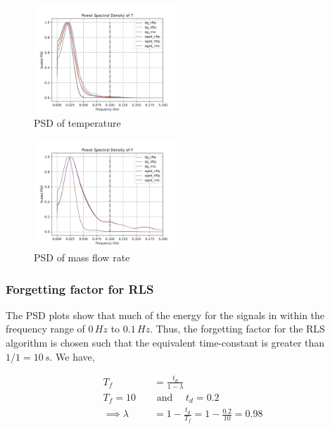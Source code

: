 \begin{multicols}{2}
       \begin{figure}[H]
        \centering
        \includegraphics[width=0.48\textwidth]{./figs/bfr_smth/test_psd/T.png}
        \caption{PSD of temperature}
       \end{figure}

       \begin{figure}[H]
        \centering
        \includegraphics[width=0.48\textwidth]{./figs/bfr_smth/test_psd/F.png}
        \caption{PSD of mass flow rate}
       \end{figure}
\end{multicols}


\subsubsection{Forgetting factor for RLS}

The PSD plots show that much of the energy for the signals in within the frequency range of $0 \, Hz$ to $0.1 \, Hz$. Thus, the forgetting factor for the RLS algorithm is chosen such that the equivalent time-constant is greater than $1/1 = 10 \, s$. We have,

\begin{align*}
        T_f &= \frac{t_d}{1 - \lambda}\\
        T_f = 10 \quad &\text{ and } \quad t_d = 0.2\\
        \implies \lambda &= 1 - \frac{t_d}{T_f} = 1 - \frac{0.2}{10} = 0.98
\end{align*}


